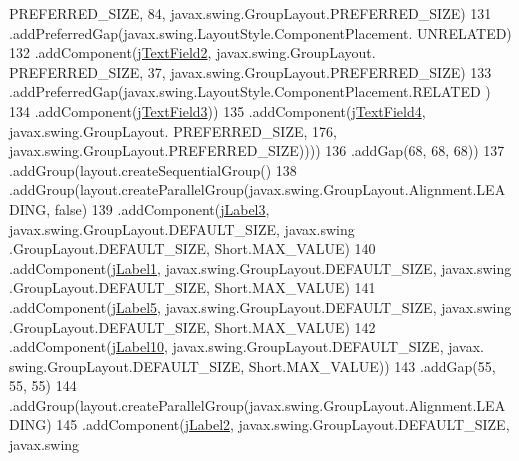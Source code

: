 \begin{DoxyCode}
      PREFERRED\_SIZE, 84, javax.swing.GroupLayout.PREFERRED\_SIZE)
131                                         .addPreferredGap(javax.swing.LayoutStyle.ComponentPlacement.
      UNRELATED)
132                                         .addComponent(\mbox{\hyperlink{class_interfaz_package_1_1_verificar_lector_a3f80f83121eebb36d3c494a791ae2e00}{jTextField2}}, javax.swing.GroupLayout.
      PREFERRED\_SIZE, 37, javax.swing.GroupLayout.PREFERRED\_SIZE)
133                                         .addPreferredGap(javax.swing.LayoutStyle.ComponentPlacement.RELATED
      )
134                                         .addComponent(\mbox{\hyperlink{class_interfaz_package_1_1_verificar_lector_a0fb6ae08627a62444fca7c09e992446d}{jTextField3}}))
135                                     .addComponent(\mbox{\hyperlink{class_interfaz_package_1_1_verificar_lector_a782676dc9af3fa99d3a06020501824f7}{jTextField4}}, javax.swing.GroupLayout.
      PREFERRED\_SIZE, 176, javax.swing.GroupLayout.PREFERRED\_SIZE))))
136                         .addGap(68, 68, 68))
137                     .addGroup(layout.createSequentialGroup()
138                         .addGroup(layout.createParallelGroup(javax.swing.GroupLayout.Alignment.LEADING, \textcolor{keyword}{
      false})
139                             .addComponent(\mbox{\hyperlink{class_interfaz_package_1_1_verificar_lector_ad3a983dda4f171c69b407375acaf226d}{jLabel3}}, javax.swing.GroupLayout.DEFAULT\_SIZE, javax.swing
      .GroupLayout.DEFAULT\_SIZE, Short.MAX\_VALUE)
140                             .addComponent(\mbox{\hyperlink{class_interfaz_package_1_1_verificar_lector_a94dfc256ea6a29f49c233c3fec52ac7d}{jLabel1}}, javax.swing.GroupLayout.DEFAULT\_SIZE, javax.swing
      .GroupLayout.DEFAULT\_SIZE, Short.MAX\_VALUE)
141                             .addComponent(\mbox{\hyperlink{class_interfaz_package_1_1_verificar_lector_a1023d3021f65695047c7e5bc41613e09}{jLabel5}}, javax.swing.GroupLayout.DEFAULT\_SIZE, javax.swing
      .GroupLayout.DEFAULT\_SIZE, Short.MAX\_VALUE)
142                             .addComponent(\mbox{\hyperlink{class_interfaz_package_1_1_verificar_lector_aa900aa48aa55e9851fd9085b6303d8af}{jLabel10}}, javax.swing.GroupLayout.DEFAULT\_SIZE, javax.
      swing.GroupLayout.DEFAULT\_SIZE, Short.MAX\_VALUE))
143                         .addGap(55, 55, 55)
144                         .addGroup(layout.createParallelGroup(javax.swing.GroupLayout.Alignment.LEADING)
145                             .addComponent(\mbox{\hyperlink{class_interfaz_package_1_1_verificar_lector_afe825b210747901c7fe1977911da0ae4}{jLabel2}}, javax.swing.GroupLayout.DEFAULT\_SIZE, javax.swing

\end{DoxyCode}
